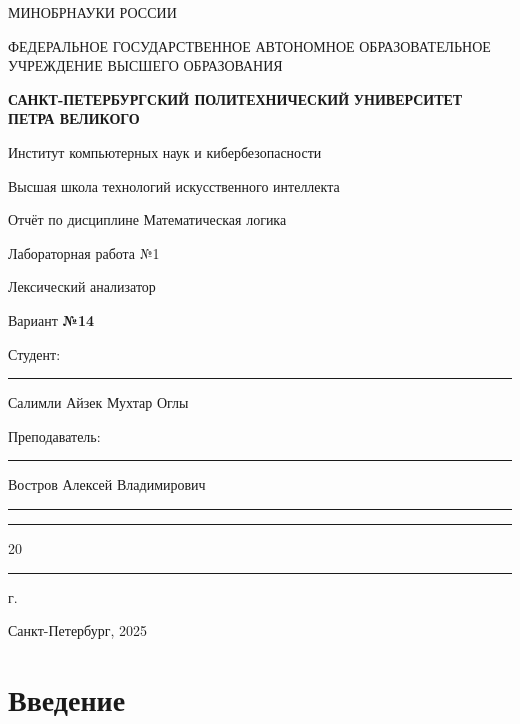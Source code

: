 \documentclass[areasetadvanced]{scrartcl}
\begin{document}
	\thispagestyle{empty}
	\begin{center}
		\large{МИНОБРНАУКИ РОССИИ} \par
		\vspace{0.3cm}
		\normalsize
		{ФЕДЕРАЛЬНОЕ ГОСУДАРСТВЕННОЕ АВТОНОМНОЕ ОБРАЗОВАТЕЛЬНОЕ УЧРЕЖДЕНИЕ ВЫСШЕГО ОБРАЗОВАНИЯ} \par
		\vspace{0.3cm}
		\textbf{\guillemotleft САНКТ-ПЕТЕРБУРГСКИЙ ПОЛИТЕХНИЧЕСКИЙ}
		\textbf{УНИВЕРСИТЕТ ПЕТРА ВЕЛИКОГО\guillemotright} \par
		\vspace{0.3cm}
		{Институт компьютерных наук и кибербезопасности}\par
		{Высшая школа технологий искусственного интеллекта}\par
	\end{center}
	\vfill
	\begin{center}
		{\large Отчёт по дисциплине \guillemotleft Математическая логика\guillemotright}\par
		{\huge   Лабораторная работа №1 
		
		\guillemotleft Лексический анализатор\guillemotright}\par
            {\huge Вариант \textbf{№14}}
         
	\end{center}
	\vfill
	\begin{flushleft}
		Студент: \hspace{1.8cm} \rule[0pt]{2.5cm}{0.5pt}\hfill Салимли Айзек Мухтар Оглы\par
		\vspace{1.5cm}
		Преподаватель: \hspace{0.55cm} \rule[0pt]{2.5cm}{0.5pt}\hfill  Востров Алексей Владимирович
	\end{flushleft}
	\vspace{0.5cm}
	\begin{flushright}
		\guillemotleft \rule[0pt]{0.8cm}{0.5pt}\guillemotright \rule[0pt]{2cm}{0.5pt} 20\rule[0pt]{0.5cm}{0.5pt} г.
	\end{flushright}
	\vfill
	\begin{center}
		Санкт-Петербург, 2025
	\end{center}
	\newpage
	\tableofcontents
	\newpage
\section*{Введение}
\end{document}

